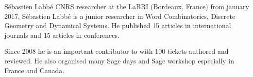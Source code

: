 \begin{participant}[type=R,PM=6,gender=male]{Sébastien Labbé}
CNRS researcher at the LaBRI (Bordeaux, France) from january 2017, Sébastien
Labbé is a junior researcher in Word Combinatorics, Discrete Geometry and
Dynamical Systems. He published 15 articles in international journals and
15 articles in conferences.

Since 2008 he is an important contributor to \Sage with 100 tickets authored and
reviewed. He also organised many Sage days and Sage workshop especially
in France and Canada.
\end{participant}

